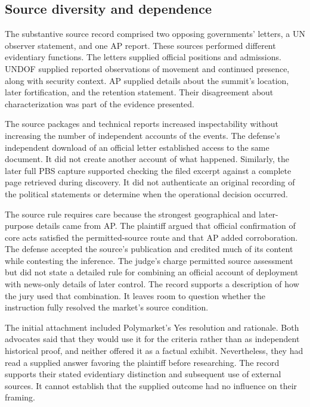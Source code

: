 \subsection{Source diversity and dependence}

The substantive source record comprised two opposing governments' letters, a UN observer statement, and one AP report.  These sources performed different evidentiary functions.  The letters supplied official positions and admissions.  UNDOF supplied reported observations of movement and continued presence, along with security context.  AP supplied details about the summit's location, later fortification, and the retention statement.  Their disagreement about characterization was part of the evidence presented.

The source packages and technical reports increased inspectability without increasing the number of independent accounts of the events.  The defense's independent download of an official letter established access to the same document.  It did not create another account of what happened.  Similarly, the later full PBS capture supported checking the filed excerpt against a complete page retrieved during discovery.  It did not authenticate an original recording of the political statements or determine when the operational decision occurred.

The source rule requires care because the strongest geographical and later-purpose details came from AP.  The plaintiff argued that official confirmation of core acts satisfied the permitted-source route and that AP added corroboration.  The defense accepted the source's publication and credited much of its content while contesting the inference.  The judge's charge permitted source assessment but did not state a detailed rule for combining an official account of deployment with news-only details of later control.  The record supports a description of how the jury used that combination.  It leaves room to question whether the instruction fully resolved the market's source condition.

The initial attachment included Polymarket's Yes resolution and rationale.  Both advocates said that they would use it for the criteria rather than as independent historical proof, and neither offered it as a factual exhibit.  Nevertheless, they had read a supplied answer favoring the plaintiff before researching.  The record supports their stated evidentiary distinction and subsequent use of external sources.  It cannot establish that the supplied outcome had no influence on their framing.

